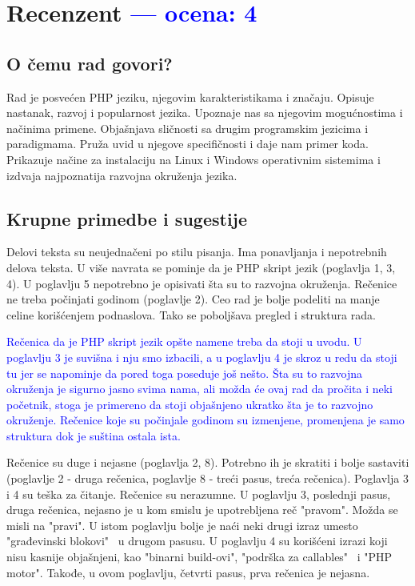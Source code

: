 \documentclass[a4paper]{report}
\newcommand{\odgovor}[1]{\textcolor{blue}{#1}}
\begin{document}
\chapter{Recenzent \odgovor{--- ocena: 4} }


\section{O čemu rad govori?}
Rad je posvećen PHP jeziku, njegovim karakteristikama i značaju. Opisuje nastanak, razvoj i popularnost jezika. Upoznaje nas sa njegovim mogućnostima i načinima primene. Objašnjava sličnosti sa drugim programskim jezicima i paradigmama. Pruža uvid u njegove specifičnosti i daje nam primer koda. Prikazuje načine za instalaciju na Linux i Windows operativnim sistemima i izdvaja najpoznatija razvojna okruženja jezika.

\section{Krupne primedbe i sugestije}
Delovi teksta su neujednačeni po stilu pisanja. Ima ponavljanja i nepotrebnih delova teksta. U više navrata se pominje da je PHP skript jezik (poglavlja 1, 3, 4). U poglavlju 5 nepotrebno je opisivati šta su to razvojna okruženja. Rečenice ne treba počinjati godinom (poglavlje 2). Ceo rad je bolje podeliti na manje celine korišćenjem podnaslova. Tako se poboljšava pregled i struktura rada.

\odgovor{Rečenica da je PHP skript jezik opšte namene treba da stoji u uvodu. U poglavlju 3 je suvišna i nju smo izbacili, a u poglavlju 4
je skroz u redu da stoji tu jer se napominje da pored toga poseduje još nešto. Šta su to razvojna okruženja je sigurno jasno svima nama, ali možda će ovaj rad da pročita i neki početnik, stoga je primereno da stoji objašnjeno ukratko šta je to razvojno okruženje.
Rečenice koje su počinjale godinom su izmenjene, promenjena je samo struktura dok je suština ostala ista.}

Rečenice su duge i nejasne (poglavlja 2, 8). Potrebno ih je skratiti i bolje sastaviti (poglavlje 2 - druga rečenica, poglavlje 8 - treći pasus, treća rečenica). Poglavlja 3 i 4 su teška za čitanje. Rečenice su nerazumne. U poglavlju 3, poslednji pasus, druga rečenica, nejasno je u kom smislu je upotrebljena reč "pravom". Možda se misli na "pravi". U istom poglavlju bolje je naći neki drugi izraz umesto "građevinski blokovi" \ u drugom pasusu. U poglavlju 4 su korišćeni izrazi koji nisu kasnije objašnjeni, kao "binarni build-ovi", "podrška za callables" \ i "PHP motor". Takođe, u ovom poglavlju, četvrti pasus, prva rečenica je nejasna. 
\end{document}
